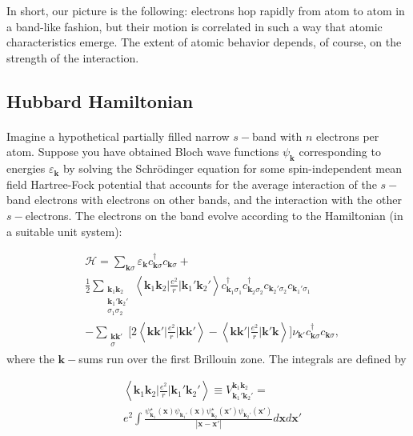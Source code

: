 \documentclass[10pt, twocolumn, twoside]{article}
\begin{document}
In short, our picture is the following: electrons hop rapidly from atom to atom in a band-like fashion, but their motion is correlated in such a way that atomic characteristics emerge. The extent of atomic behavior depends, of course, on the strength of the interaction.

\subsection{Hubbard Hamiltonian}\label{hubbardHamiltonian}\paragraph{}

Imagine a hypothetical partially filled narrow $s-$band with $n$ electrons per atom. Suppose you have obtained Bloch wave functions $\psi_{\bm k}$ corresponding to energies $\varepsilon_{\bm k}$ by solving the Schr\"odinger equation for some spin-independent mean field Hartree-Fock potential that accounts for the average interaction of the $s-$band electrons with electrons on other bands, and the interaction with the other $s-$electrons. The electrons on the band evolve according to the Hamiltonian (in a suitable unit system):

\begin{equation}\label{eq:startingHamiltonian}
\begin{split}
&\mathcal{H} = \sum_{\bm k \sigma} \varepsilon_{\bm k} c_{\bm k \sigma}^\dagger c_{\bm k \sigma} + \\
&\frac{1}{2} \sum_{ \substack{\bm k_1 \bm k_2 \\ \bm k_1' \bm k_2' \\ \sigma_1 \sigma_2 } } \left\langle \bm k_1 \bm k_2 \bigg| \frac{e^2}{r} \bigg| \bm k_1' \bm k_2' \right\rangle 
 c_{\bm k_1 \sigma_1}^\dagger c_{\bm k_2 \sigma_2}^\dagger c_{\bm k_2' \sigma_2} c_{\bm k_1' \sigma_1} \\
 &- \sum_{ \substack{\bm k \bm k' \\ \sigma} } \bigg[ 2 \left\langle \bm k \bm k' \bigg| \frac{e^2}{r} \bigg| \bm k \bm k' \right\rangle - \left\langle \bm k \bm k' \bigg| \frac{e^2}{r} \bigg| \bm k' \bm k \right\rangle \bigg] \nu_{\bm k'} c_{\bm k \sigma}^\dagger c_{\bm k \sigma} ,
\end{split}
\end{equation}
where the $\bm k-$sums run over the first Brillouin zone. The integrals are defined by

\begin{equation}\label{eq:integrals}
\begin{split}
&\left\langle \bm k_1 \bm k_2 \bigg| \frac{e^2}{r} \bigg| \bm k_1' \bm k_2' \right\rangle \equiv V^{\bm k_1 \bm k_2}_{\bm k_1' \bm k_2'}  =  \\
&e^2 \int \frac{\psi_{\bm k_1}^\star (\bm x) \psi_{\bm k_1'} (\bm x) \psi_{\bm k_2}^\star (\bm x') \psi_{\bm k_2'}(\bm x') }{| \bm x - \bm x' |} d\bm x d\bm x'
\end{split}
\end{equation}
\end{document}
